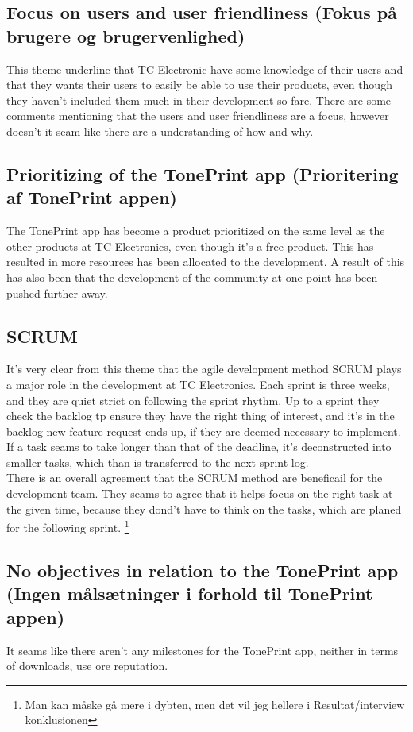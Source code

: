 \subsection*{Focus on users and user friendliness (Fokus på brugere og brugervenlighed)} 
\label{ThemeFocusOnUsersAndUserFriendliness}
This theme underline that TC Electronic have some knowledge of their users and that they wants their users to easily be able to use their products, even though they haven't included them much in their development so fare. There are some comments mentioning that the users and user friendliness are a focus, however doesn't it seam like there are a understanding of how and why.

\subsection*{Prioritizing of the TonePrint app (Prioritering af TonePrint appen)} 
\label{ThemePrioritizingOfTheTonePrintApp}
The TonePrint app has become a product prioritized on the same level as the other products at TC Electronics, even though it's a free product. This has resulted in more resources has been allocated to the development. A result of this has also been that the development of the community at one point has been pushed further away.

\subsection*{SCRUM}
\label{ThemeScrum}
It's very clear from this theme that the agile development method SCRUM plays a major role in the development at TC Electronics. Each sprint is three weeks, and they are quiet strict on following the sprint rhythm. Up to a sprint they check the backlog tp ensure they have the right thing of interest, and it's in the backlog new feature request ends up, if they are deemed necessary to implement. If a task seams to take longer than that of the deadline, it's deconstructed into smaller tasks, which than is transferred to the next sprint log.\\
There is an overall agreement that the SCRUM method are beneficail for the development team. They seams to agree that it helps focus on the right task at the given time, because they dond't have to think on the tasks, which are planed for the following sprint. \footnote{Man kan måske gå mere i dybten, men det vil jeg hellere i Resultat/interview konklusionen} 

\subsection*{No objectives in relation to the TonePrint app (Ingen målsætninger i forhold til TonePrint appen)} 
\label{ThemeNoObjectivesInRelationToTheTonePrintApp}
It seams like there aren't any milestones for the TonePrint app, neither in terms of downloads, use ore reputation. 

